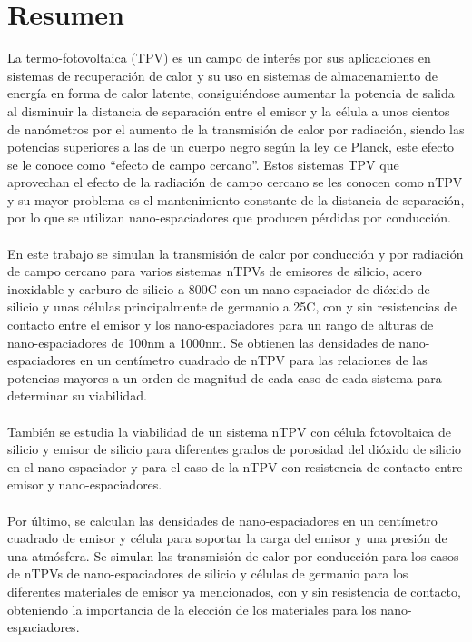 \chapter{Resumen}

La termo-fotovoltaica (TPV) es un campo de interés por sus aplicaciones en sistemas de recuperación de calor y su uso en sistemas de almacenamiento de energía en forma de calor latente, consiguiéndose aumentar la potencia de salida al disminuir la distancia de separación entre el emisor y la célula a unos cientos de nanómetros por el aumento de la transmisión de calor por radiación, siendo las potencias superiores a las de un cuerpo negro según la ley de Planck, este efecto se le conoce como ``efecto de campo cercano''. Estos sistemas TPV que aprovechan el efecto de la radiación de campo cercano se les conocen como nTPV y su mayor problema es el mantenimiento constante de la distancia de separación, por lo que se utilizan nano-espaciadores que producen pérdidas por conducción.\\\\
En este trabajo se simulan la transmisión de calor por conducción y por radiación de campo cercano para varios sistemas nTPVs de emisores de silicio, acero inoxidable y carburo de silicio a 800\textdegree C con un nano-espaciador de dióxido de silicio y unas células principalmente de germanio a 25\textdegree C, con y sin resistencias de contacto entre el emisor y los nano-espaciadores para un rango de alturas de nano-espaciadores de 100nm a 1000nm. Se obtienen las densidades de nano-espaciadores en un centímetro cuadrado de nTPV para las relaciones de las potencias mayores a un orden de magnitud de cada caso de cada sistema para determinar su viabilidad.\\\\
También se estudia la viabilidad de un sistema nTPV con célula fotovoltaica de silicio y emisor de silicio para diferentes grados de porosidad del dióxido de silicio en el nano-espaciador y para el caso de la nTPV con resistencia de contacto entre emisor y nano-espaciadores.\\\\
Por último, se calculan las densidades de nano-espaciadores en un centímetro cuadrado de emisor y célula para soportar la carga del emisor y una presión de una atmósfera. Se simulan las transmisión de calor por conducción para los casos de nTPVs de nano-espaciadores de silicio y células de germanio para los diferentes materiales de emisor ya mencionados, con y sin resistencia de contacto, obteniendo la importancia de la elección de los materiales para los nano-espaciadores.


